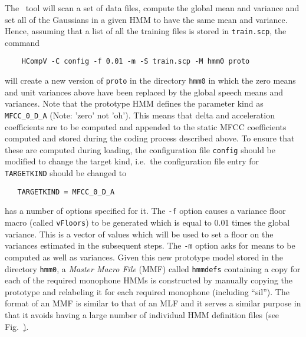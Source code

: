 The \HTK\ tool  will scan a set of data files, compute
the global mean and variance and set all of the Gaussians in a given HMM
to have the same mean and variance.
Hence, assuming that a list of all the training files is stored in
\texttt{train.scp}, the command
\begin{verbatim}
    HCompV -C config -f 0.01 -m -S train.scp -M hmm0 proto
\end{verbatim}
will create a new version of \texttt{proto} in the directory \texttt{hmm0}
in which the zero means and unit variances above have been replaced
by the global speech means and variances.
Note that the prototype HMM defines the parameter kind as \texttt{MFCC\_0\_D\_A} (Note: 'zero' not 'oh').
This means that delta and acceleration coefficients are to be computed and
appended to the static MFCC coefficients computed and stored during the
coding process described above.  To ensure that these are computed during loading,
the configuration file \texttt{config} should be modified
to change the target kind, i.e.\ the configuration file entry for
\texttt{TARGETKIND} should be changed to
\begin{verbatim}
   TARGETKIND = MFCC_0_D_A
\end{verbatim}
 has a number of options specified for it.  The 
\texttt{-f} option causes a variance floor 
macro (called \texttt{vFloors}) to be generated which
is equal to 0.01 times the global variance.  This is a vector
of values which will be used to set a floor on the variances estimated
in the subsequent steps.  The \texttt{-m} option asks for means to be computed
as well as variances.  Given this
new prototype model stored in the directory
\texttt{hmm0}, a \textit{Master Macro File} 
(MMF) called \texttt{hmmdefs} 
containing a copy for each of the required monophone HMMs is constructed 
by manually copying the prototype and relabeling it for each required 
monophone (including ``sil'').  
The format of an MMF is similar to that
of an MLF and it serves a similar purpose in that it avoids having
a large number of individual HMM definition files 
(see Fig.~\href{f:MMFeg}).


